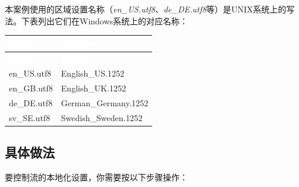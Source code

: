 
本案例使用的区域设置名称（\textit{en\_US.utf8}、\textit{de\_DE.utf8}等）是UNIX系统上的写法。下表列出它们在Windows系统上的对应名称：



\myTableBegin
\begin{xltabular}{\textwidth}{|>{\hsize\raggedright\arraybackslash}X|>{\hsize\raggedright\arraybackslash}X|}
\hline
{} \textcolor{white}{\textbf{UNIX}} & \textcolor{white}{\textbf{Windows}} \\
\hline
\endfirsthead
{} \textcolor{white}{\textbf{UNIX}} & \textcolor{white}{\textbf{Windows}} \\
\hline
\endhead
en\_US.utf8 & English\_US.1252 \\
\hline
en\_GB.utf8 & English\_UK.1252 \\
\hline
de\_DE.utf8 & German\_Germany.1252 \\
\hline
sv\_SE.utf8 & Swedish\_Sweden.1252 \\
\hline
\end{xltabular}
\myTableEnd



\subsection{具体做法}



要控制流的本地化设置，你需要按以下步骤操作：



